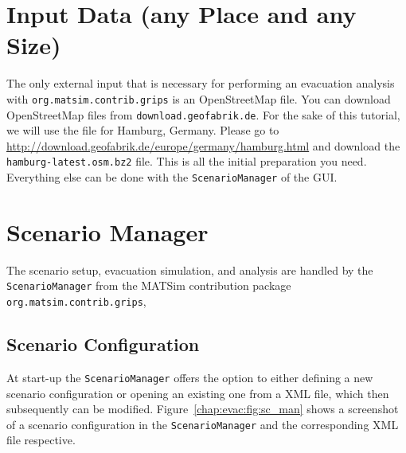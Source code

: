 \section{Input Data (any Place and any Size)}
\label{grips:input}
The only external input that is necessary for performing an evacuation analysis with \lstinline|org.matsim.contrib.grips| is an OpenStreetMap file.
You can download OpenStreetMap files from \lstinline|download.geofabrik.de|.
For the sake of this tutorial, we will use the file for Hamburg, Germany. 
Please go to \url{http://download.geofabrik.de/europe/germany/hamburg.html} and download the \lstinline|hamburg-latest.osm.bz2| file. This is all the initial preparation you need. Everything else can 
be done with the \lstinline|ScenarioManager| of the GUI.

\section{Scenario Manager}
\label{grips:scm}
The scenario setup, evacuation simulation, and analysis are handled by the \lstinline|ScenarioManager| from the MATSim contribution package \lstinline|org.matsim.contrib.grips|, 

\subsection{Scenario Configuration}
At start-up the \lstinline|ScenarioManager| offers the option to either defining a new scenario configuration or opening an existing one from a XML file, which then subsequently can be modified. Figure~\ref{chap:evac:fig:sc_man} shows a screenshot of a scenario configuration in the \lstinline|ScenarioManager| and the corresponding XML file respective.

